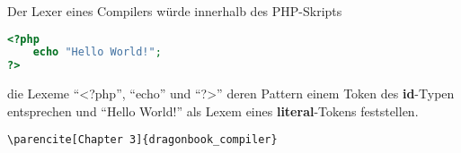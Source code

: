 \documentclass{standalone}
\begin{document}
Der Lexer eines Compilers würde innerhalb des PHP-Skripts
\begin{lstlisting}[language=PHP]
<?php
	echo "Hello World!";
?>
\end{lstlisting}
die Lexeme \enquote{<?php}, \enquote{echo} und \enquote{?>} deren Pattern einem Token des \textbf{id}-Typen entsprechen und \enquote{Hello World!} als Lexem eines \textbf{literal}-Tokens feststellen.


\verb|\parencite[Chapter 3]{dragonbook_compiler}|

\end{document}
